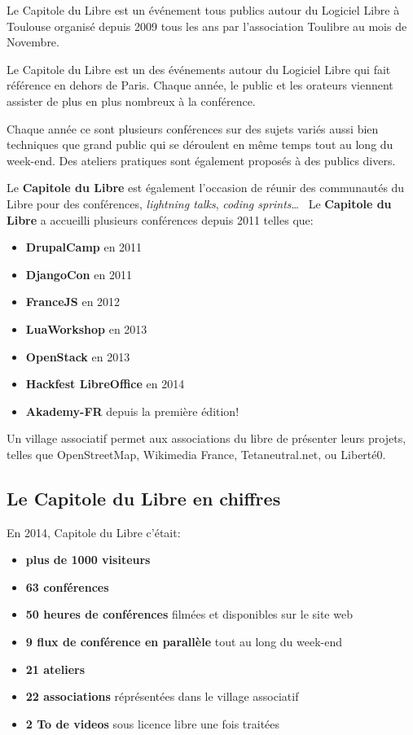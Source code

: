 
Le Capitole du Libre est un événement tous publics autour du Logiciel Libre à Toulouse organisé depuis 2009 tous les ans par l'association Toulibre au mois de Novembre.

Le Capitole du Libre est un des événements autour du Logiciel Libre qui fait référence en dehors de Paris. Chaque année, le public et les orateurs viennent assister de plus en plus nombreux à la conférence. 

Chaque année ce sont plusieurs conférences sur des sujets variés 
aussi bien techniques que grand public qui se déroulent en même temps 
tout au long du week-end. Des ateliers pratiques sont également proposés 
à des publics divers.

\Separateur

Le \textbf{Capitole du Libre} est également l'occasion de réunir des 
communautés du Libre pour des conférences, \textit{lightning talks}, 
\textit{coding sprints}\dots ~ Le \textbf{Capitole du Libre} a 
accueilli plusieurs conférences depuis 2011 telles que:
\begin{itemize}[label=$\bullet$]
\item \textbf{DrupalCamp} en 2011
\item \textbf{DjangoCon} en 2011
\item \textbf{FranceJS} en 2012
\item \textbf{LuaWorkshop} en 2013
\item \textbf{OpenStack} en 2013
\item \textbf{Hackfest LibreOffice}  en 2014
\item \textbf{Akademy-FR} depuis la première édition!
\end{itemize}

\Separateur

Un village associatif permet aux associations du libre de présenter 
leurs projets, telles que OpenStreetMap, Wikimedia France, 
Tetaneutral.net, ou Liberté0.

\subsection{Le Capitole du Libre en chiffres}

En 2014, Capitole du Libre c'était:
\begin{itemize}[label=$\bullet$]
\item \textbf{plus de 1000 visiteurs}
\item \textbf{63 conférences}
\item \textbf{50 heures de conférences} filmées et disponibles sur le site web
\item \textbf{9 flux de conférence en parallèle} tout au long du week-end
\item \textbf{21 ateliers}
\item \textbf{22 associations} réprésentées dans le village associatif
\item \textbf{2 To de videos} sous licence libre une fois traitées
\end{itemize}

